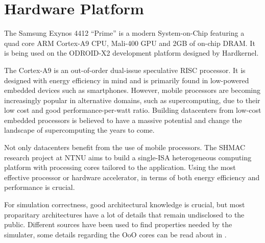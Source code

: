 \section{Hardware Platform}

The Samsung Exynos 4412 ``Prime'' is a modern System-on-Chip featuring a quad
core ARM Cortex-A9 CPU, Mali-400 GPU and 2GB of on-chip DRAM. It is being used
on the ODROID-X2 development platform designed by Hardkernel.

The Cortex-A9 is an out-of-order dual-issue speculative RISC processor. It is
designed with energy efficiency in mind and is primarily found in low-powered
embedded devices such as smartphones. However, mobile processors are becoming
increasingly popular in alternative domains, such as supercomputing, due to
their low cost and good performance-per-watt ratio. Building datacenters from
low-cost embedded processors is believed to have a massive potential and change
the landscape of supercomputing the years to come.

Not only datacenters benefit from the use of mobile processors. The SHMAC
research project at NTNU aims to build a single-ISA heterogeneous computing
platform with processing cores tailored to the application. Using the most
effective processor or hardware accelerator, in terms of both energy efficiency
and performance is crucial.

For simulation correctness, good architectural knowledge is crucial, but most
proparitary architectures have a lot of details that remain undisclosed to the
public. Different sources have been used to find properties needed by the simulater,
some details regarding the OoO cores can be read about in \cite{blem2013detailed}.
